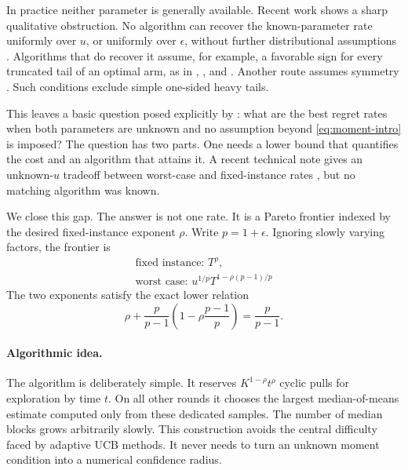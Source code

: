 \documentclass[twoside]{article}
\begin{document}
In practice neither parameter is generally available. Recent work shows a
sharp qualitative obstruction. No algorithm can recover the known-parameter
rate uniformly over $u$, or uniformly over $\epsilon$, without further
distributional assumptions \citep{genalti2024adaptive}. Algorithms that do
recover it assume, for example, a favorable sign for every truncated tail of
an optimal arm, as in \citet{huang2022adaptive}, \citet{genalti2024adaptive},
and \citet{chen2025uniinf}. Another route assumes symmetry
\citep{tamas2024data}. Such conditions exclude simple one-sided heavy tails.

This leaves a basic question posed explicitly by
\citet{genalti2025open}: what are the best regret rates when both parameters
are unknown and no assumption beyond \eqref{eq:moment-intro} is imposed?
The question has two parts. One needs a lower bound that quantifies the cost
and an algorithm that attains it. A recent technical note gives an
unknown-$u$ tradeoff between worst-case and fixed-instance rates
\citep{genalti2025lower}, but no matching algorithm was known.

We close this gap. The answer is not one rate. It is a Pareto frontier
indexed by the desired fixed-instance exponent $\rho$. Write
$p=1+\epsilon$. Ignoring slowly varying factors, the frontier is
\begin{equation}
 \boxed{\begin{gathered}
 \text{fixed instance: }T^\rho,\\[-1mm]
 \text{worst case: }u^{1/p}T^{1-\rho(p-1)/p}
 \end{gathered}}
 \label{eq:frontier-intro}
\end{equation}
The two exponents satisfy the exact lower relation
\begin{equation}
 \rho+\frac{p}{p-1}\left(1-\rho\frac{p-1}{p}\right)
 =\frac{p}{p-1}.
 \label{eq:equality-intro}
\end{equation}

\paragraph{Algorithmic idea.}
The algorithm is deliberately simple. It reserves
$K^{1-\rho}t^\rho$ cyclic pulls for exploration by time $t$. On all other
rounds it chooses the largest median-of-means estimate computed only from
these dedicated samples. The number of median blocks grows arbitrarily
slowly. This construction avoids the central difficulty faced by adaptive
UCB methods. It never needs to turn an unknown moment condition into a
numerical confidence radius.
\end{document}
